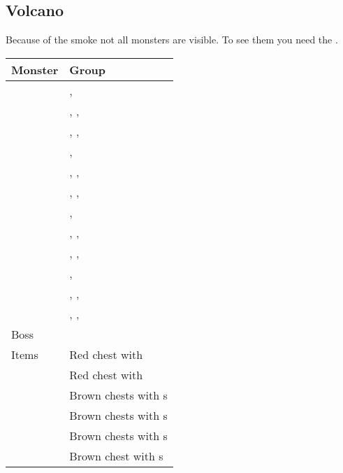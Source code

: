 \subsection{Volcano}
\label{map:volcano}

Because of the smoke not all monsters are visible. To see them you need the .


\noindent\begin{tabularx}{\textwidth}[l]{lX}
	Monster & Group
\\ \hline
	\nameref{monster:were_wolf}
	& \nameref{monster:were_wolf}, \nameref{monster:were_wolf} \\
	& \nameref{monster:were_wolf}, \nameref{monster:were_wolf}, \nameref{monster:nitemare} \\
	& \nameref{monster:were_wolf}, \nameref{monster:were_wolf}, \nameref{monster:were_wolf}
\\ \hline
	\nameref{monster:red_bone}
	& \nameref{monster:red_bone}, \nameref{monster:red_bone} \\
	& \nameref{monster:red_bone}, \nameref{monster:red_bone}, \nameref{monster:zombie} \\
	& \nameref{monster:red_bone}, \nameref{monster:red_bone}, \nameref{monster:red_bone}
\\ \hline
	\nameref{monster:ghost}
	& \nameref{monster:ghost}, \nameref{monster:ghost} \\
	& \nameref{monster:ghost}, \nameref{monster:ghost}, \nameref{monster:red_bone} \\
	& \nameref{monster:ghost}, \nameref{monster:ghost}, \nameref{monster:ghost}
\\ \hline
	\nameref{monster:nitemare}
	& \nameref{monster:nitemare}, \nameref{monster:nitemare} \\
	& \nameref{monster:nitemare}, \nameref{monster:nitemare}, \nameref{monster:red_bone} \\
	& \nameref{monster:nitemare}, \nameref{monster:nitemare}, \nameref{monster:nitemare}
\\ \hline
	Boss & \nameref{monster:medusa}
\\ \hline
	Items
	& Red chest with \nameref{item:mask} \\
	& Red chest with \nameref{spell:white} \\
	& Brown chests with \nameref{item:cure_potion}s \\
	& Brown chests with \nameref{item:heal_potion}s \\
	& Brown chests with \nameref{weapon:bomb}s \\
	& Brown chest with \nameref{item:refresher}s
\end{tabularx}
